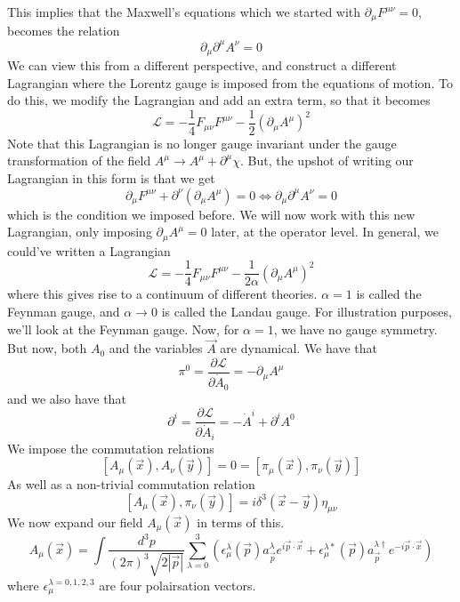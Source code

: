 This implies that the Maxwell's equations which we started with $ \partial  _ \mu F ^{ \mu \nu }  =0 $, 
becomes the relation 
\[
 \partial  _ \mu \partial ^ \mu A ^ \nu  =0 
\] We can view this from a 
different perspective, and construct a 
different Lagrangian where the Lorentz gauge 
is imposed from the equations of motion. 
To do this, we modify the Lagrangian and 
add an extra term, so that it becomes 
\[
	\mathcal{ L }  =  - \frac{1}{4 } F _{ \mu \nu } F ^{ \mu \nu }  - \frac{1}{2 } \left( \partial  
	_ \mu A ^ \mu \right)  ^ 2 
\] Note that this Lagrangian is no longer gauge invariant
under the gauge transformation of the field $ A ^ \mu \to A ^ \mu + \partial  ^ \mu \chi $. 
But, the upshot of 
writing our Lagrangian in this form
is that we get 
\[
	\partial  _ \mu F ^{ \mu \nu } + \partial  ^ \nu \left( \partial  _ \mu 
	A ^ \mu \right)   = 0 \iff \partial  _ \mu \partial  ^ \mu A ^ \nu  =0 
\] which is the condition we imposed before. 
We will now work with this new Lagrangian, 
only imposing $\partial  _ \mu A ^ \mu  =0 $ later, 
at the operator level. 
In general, we could've written a Lagrangian 
\[
	\mathcal{ L } =   - \frac{1}{4 } F _{ \mu \nu } F ^{ \mu \nu }  - \frac{1}{2 \alpha } \left( 
	\partial  _ \mu A ^ \mu \right)  ^ 2 
\] where this gives rise to a continuum 
of different theories. $ \alpha = 1 $ is called 
the Feynman gauge, and $ \alpha \to 0 $ is 
called the Landau gauge. 
For illustration purposes, we'll look at the Feynman gauge. 
Now, for $ \alpha =1 $, we have no gauge symmetry. 
But now, both $ A _ 0 $ and the variables $ \vec{A} $ are dynamical. 
We have that 
\[
	\pi ^ 0 = \frac{\partial  \mathcal{ L } }{\partial  \dot{ A } _ 0  }   =  - \partial  _ \mu A ^ \mu 
\]  and we also have that 
\[
	\partial  ^ i = \frac{\partial  \mathcal{ L } }{\partial  \dot { A} _ i }   = - \dot { A } ^ i + 
	\partial  ^ i A ^ 0 
\] We impose the commutation 
relations 
\[
	\left[  A _ \mu ( \vec{x} ) , A _ \nu ( \vec{y} )  \right]   = 0 
	= \left[  \pi _ \mu ( \vec{x} ) , \pi _ \nu ( \vec{y} )  \right]  
\] As well as a non-trivial commutation relation 
\[
	\left[  A _ \mu ( \vec{x} ) , \pi _ \nu ( \vec{y} )  \right]   = i \delta ^ 3 ( \vec{x} - \vec{y} ) 
	\eta _{ \mu \nu } 
\] We now expand our field $ A _ \mu ( \vec{x} ) $ in terms 
of this. 
\[
	A _ \mu ( \vec{x} )  = \int \frac{ d ^ 3 p }{ ( 2 \pi )^{ 3 }  \sqrt{2  | \vec{p} | }  } 
	\sum _{ \lambda = 0 } ^ 3 \left(  \epsilon _\mu ^ \lambda ( \vec{p} ) a _{ \vec{p} } ^ \lambda 
	e ^{ i \vec{p} \cdot  \vec{x} } + \epsilon _ \mu ^{ \lambda * } (\vec{p} ) a_{\vec{p} } ^{ \lambda \dagger } 
e ^{ - i \vec{p} \cdot  \vec{x} } \right) 
\] where $ \epsilon _ \mu ^{ \lambda = 0 , 1, 2, 3 } $ are four polairsation vectors. 
